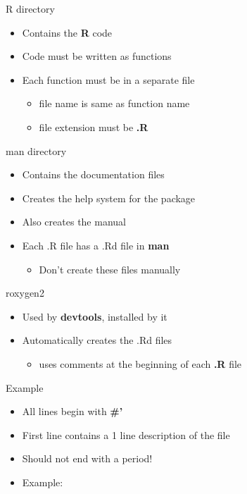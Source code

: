 \documentclass[
  ignorenonframetext,
  aspectratio=169]{beamer}
\providecommand{\tightlist}{%
  \setlength{\itemsep}{0pt}\setlength{\parskip}{0pt}}
\begin{document}
\begin{frame}{R directory}
\protect\hypertarget{r-directory}{}
\begin{itemize}
\tightlist
\item
  Contains the \textbf{R} code
\item
  Code must be written as functions
\item
  Each function must be in a separate file

  \begin{itemize}
  \tightlist
  \item
    file name is same as function name
  \item
    file extension must be \textbf{.R}
  \end{itemize}
\end{itemize}
\end{frame}

\begin{frame}{man directory}
\protect\hypertarget{man-directory}{}
\begin{itemize}
\tightlist
\item
  Contains the documentation files
\item
  Creates the help system for the package
\item
  Also creates the manual
\item
  Each .R file has a .Rd file in \textbf{man}

  \begin{itemize}
  \tightlist
  \item
    Don't create these files manually
  \end{itemize}
\end{itemize}
\end{frame}

\begin{frame}{roxygen2}
\protect\hypertarget{roxygen2}{}
\begin{itemize}
\tightlist
\item
  Used by \textbf{devtools}, installed by it
\item
  Automatically creates the .Rd files

  \begin{itemize}
  \tightlist
  \item
    uses comments at the beginning of each \textbf{.R} file
  \end{itemize}
\end{itemize}
\end{frame}

\begin{frame}{Example}
\protect\hypertarget{example}{}
\begin{itemize}
\tightlist
\item
  All lines begin with \textbf{\#'}
\item
  First line contains a 1 line description of the file
\item
  Should not end with a period!
\item
  Example:
\end{itemize}
\end{frame}
\end{document}
